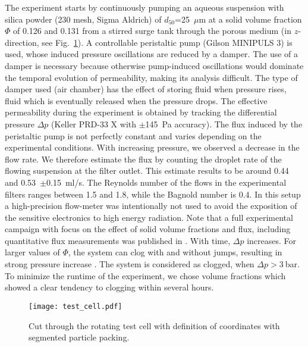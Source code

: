 \documentclass[smallextended]{svjour3}       %
\begin{document}
The experiment starts by continuously pumping an aqueous suspension with silica powder (230 mesh, Sigma Aldrich) of $d_{50}$=25~$\mu$m at a solid volume fraction $\Phi$ of 0.126 and 0.131 from a stirred surge tank through the porous medium (in $z$-direction, see Fig.~\ref{fig:testcell}). A controllable peristaltic pump (Gilson MINIPULS 3) is used, whose induced pressure oscillations are reduced by a damper. The use of a damper is necessary because otherwise pump-induced oscillations would dominate the temporal evolution of permeability, making its analysis difficult. The type of damper used (air chamber) has the effect of storing fluid when pressure rises, fluid which is eventually released when the pressure drops. The effective permeability during the experiment is obtained by tracking the differential pressure $\Delta p$ (Keller PRD-33 X with $\pm$145~Pa accuracy). The flux induced by the peristaltic pump is not perfectly constant and varies  depending on the experimental conditions. With increasing pressure, we observed a decrease in the flow rate. We therefore estimate the flux by counting the droplet rate of the flowing suspension at the filter outlet. This estimate results to be around 0.44 and 0.53~$\pm$0.15~ml/s. The Reynolds number of the flows in the experimental filters ranges between 1.5 and 1.8, while the Bagnold number is 0.4. In this setup a high-precision flow-meter was intentionally not used to avoid the exposition of the sensitive electronics to high energy radiation. Note that a full experimental campaign with focus on the effect of solid volume fractions and flux, including quantitative flux measurements was published in \cite{Bianchi-etal_2017}. With time, $\Delta p$ increases. For larger values of $\Phi$, the system can clog with and without jumps, resulting in strong pressure increase \cite{Bianchi-etal_2017}. The system is considered as clogged, when $\Delta p>3~$bar. To minimize the runtime of the experiment, we chose volume fractions which showed a clear tendency to clogging within several hours.
\begin {figure}[htb]
\texttt{[image: test\_cell.pdf]}
\caption{\label{fig:testcell} Cut through the rotating test cell with definition of coordinates with segmented particle packing.}
\end{figure}
\end{document}
